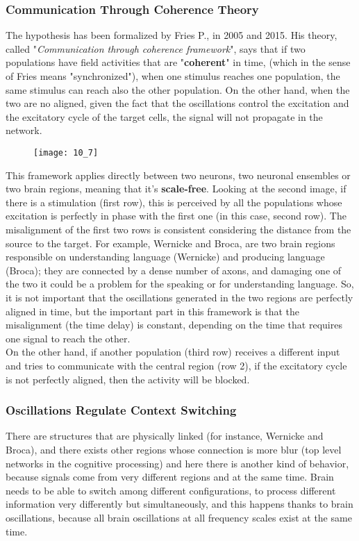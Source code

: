 \subsubsection{Communication Through Coherence Theory}
The hypothesis has been formalized by Fries P., in 2005 and 2015. His theory, called "\textit{Communication through coherence framework}", says that if two populations 
have field activities that are "\textbf{coherent}" in time, (which in the sense of Fries means "synchronized"), when one stimulus reaches one population, the same stimulus 
can reach also the other population. On the other hand, when the two are no aligned, given the fact that the oscillations control the excitation and the excitatory cycle 
of the target cells, the signal will not propagate in the network.
\begin{figure}[H]
    \texttt{[image: 10\_7]}
    \centering
\end{figure}
This framework applies directly between two neurons, two neuronal ensembles or two brain regions, meaning that 
it's \textbf{scale-free}.
Looking at the second image, if there is a stimulation (first row), this is perceived by all the populations whose 
excitation is perfectly in phase with the first one (in this case, second row). The misalignment of the first two rows 
is consistent considering the distance from the source to the target. For example, Wernicke and Broca, are two brain 
regions responsible on understanding language (Wernicke) and producing language (Broca); 
they are connected by a dense number of axons, and damaging one of the two it could be a problem for the speaking or for understanding language. 
So, it is not important that the oscillations generated in the two regions are perfectly aligned in time, but the important part in this framework is 
that the misalignment (the time delay) is constant, depending on the time that requires one signal to reach the other.\\
On the other hand, if another population (third row) receives a different input and tries to communicate with the central region (row 2), if the excitatory cycle is not 
perfectly aligned, then the activity will be blocked.

\subsubsection{Oscillations Regulate Context Switching}
There are structures that are physically linked (for instance, Wernicke and Broca), and there exists other regions whose connection is more blur (top level networks in the 
cognitive processing) and here there is another kind of behavior, because signals come from very different regions and at the same time. Brain needs to be able to switch 
among different configurations, to process different information very differently but simultaneously, and this happens thanks to brain oscillations, because all brain 
oscillations at all frequency scales exist at the same time.